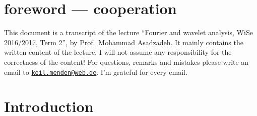 
\newcommand{\Semester}{WiSe 2016/2017, Term 2}
\newcommand{\fach}{Fourier and wavelet analysis}
\newcommand{\prof}{Prof.\ Mohammad Asadzadeh}






\maketitle
\cleardoubleoddemptypage

\section*{foreword --- cooperation}
This document is a transcript of the lecture \enquote{\fach, \Semester}, by \prof.
It mainly contains the written content of the lecture. I will not assume any responsibility for the correctness of the content! For questions, remarks and mistakes please write an email to \href{mailto:keil.menden@web.de}{\nolinkurl{keil.menden@web.de}}. I'm grateful for every email. 
\newpage

\newpage

\tableofcontents
\cleardoubleoddemptypage
{}
\setcounter{page}{1}

\section{Introduction} 
\label{sec:introduction}



\cleardoubleoddemptypage
{}
\setcounter{page}{1}


